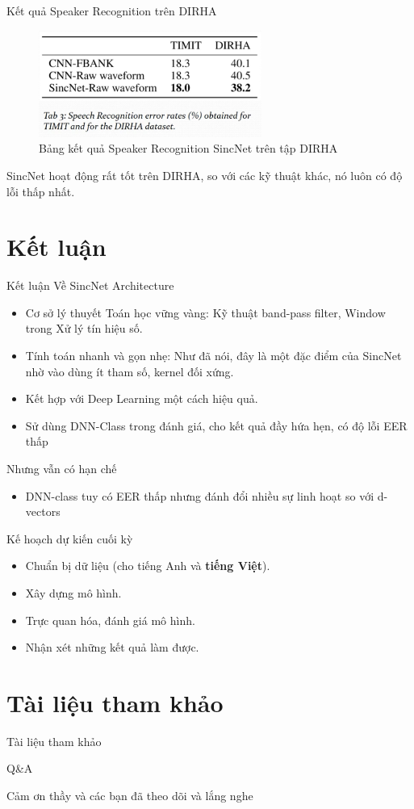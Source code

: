 \documentclass[notheorems, aspectratio=54]{beamer}
\begin{document}
\begin{frame}{Kết quả Speaker Recognition trên DIRHA}
	\begin{figure}[H]
		\centering
		\includegraphics[width=0.65\textwidth]{images/sr_sincnet_result.png}
		\caption{Bảng kết quả Speaker Recognition SincNet trên tập DIRHA}
		\label{fig:writing-thesis}
	\end{figure}
	SincNet hoạt động rất tốt trên DIRHA, so với các kỹ thuật khác, nó luôn có độ lỗi thấp nhất.	
\end{frame}

\section{Kết luận}
\begin{frame}{Kết luận}
	Về SincNet Architecture
	\begin{itemize}
		\item Cơ sở lý thuyết Toán học vững vàng: Kỹ thuật band-pass filter, Window trong Xử lý tín hiệu số.
		\item Tính toán nhanh và gọn nhẹ: Như đã nói, đây là một đặc điểm của SincNet nhờ vào dùng ít tham số, kernel đối xứng.
		\item Kết hợp với Deep Learning một cách hiệu quả.
		\item Sử dùng DNN-Class trong đánh giá, cho kết quả đầy hứa hẹn, có độ lỗi EER thấp
	\end{itemize}
	Nhưng vẫn có hạn chế
	\begin{itemize}
		\item DNN-class tuy có EER thấp nhưng đánh đổi nhiều sự linh hoạt so với d-vectors
	\end{itemize}
\end{frame}
\begin{frame}{Kế hoạch dự kiến cuối kỳ}
	\begin{itemize}
		\item Chuẩn bị dữ liệu (cho tiếng Anh và \textbf{tiếng Việt}).
		\item Xây dựng mô hình.
		\item Trực quan hóa, đánh giá mô hình.
		\item Nhận xét những kết quả làm được.
	\end{itemize}
\end{frame}

\section{Tài liệu tham khảo}
\begin{frame}{Tài liệu tham khảo}
	\nocite{*}
	\newpage\cleardoublepage
	
\end{frame}


\begin{frame}{Q\&A}
	\begin{center}
		\Huge Cảm ơn thầy và các bạn đã theo dõi và lắng nghe
	\end{center}
\end{frame}
\end{document}
